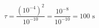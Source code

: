 \documentclass[preview]{standalone}
\begin{document}
\[\tau = \frac{(10^{-4})^2}{10^{-10}} = \frac{10^{-8}}{10^{-10}} = 100 \text{ s}\]
\end{document}
